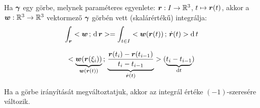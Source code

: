 \documentclass[main.tex]{subfiles}
\begin{document}

Ha $\bm{\gamma}$ egy görbe, melynek paraméteres egyenlete:
$\bm{r} : I \rightarrow \mathbb{R}^3$, $t \mapsto \bm{r}(t)$,
akkor a $\bm{w}: \mathbb{R}^3 \rightarrow \mathbb{R}^3$ vektormező
$\bm{\gamma}$ görbén vett (skalárértékű) integrálja:
\begin{equation*}
  \int_{\rvec{r}} \scalar{\rvec{w}}{\differential \, \rvec{r}}
  = \int_{t \in I} \scalar{
    \rvec{w}(\rvec{r}(t))
  }{\dot{\rvec{r}}(t)} \differential \, t
\end{equation*}




\begin{equation*}
  \scalar{
    \underbrace{\rvec{w}(\rvec{r}(\xi_i))}_{
      \rvec{w}(\rvec{r}(t))
    }
  }{
    \underbrace{\dfrac{
        \rvec{r}(t_i) - \rvec{r}(t_{i-1})
      }{t_i - t_{i-1}}}_{\dot{\rvec{r}}(t)}
  } (
  \underbrace{t_i - t_{i-1}}_{\differential t}
  )
\end{equation*}




Ha a görbe irányítását megváltoztatjuk,
akkor az integrál értéke $(-1)$-szeresére változik.



\pagebreak
\end{document}
